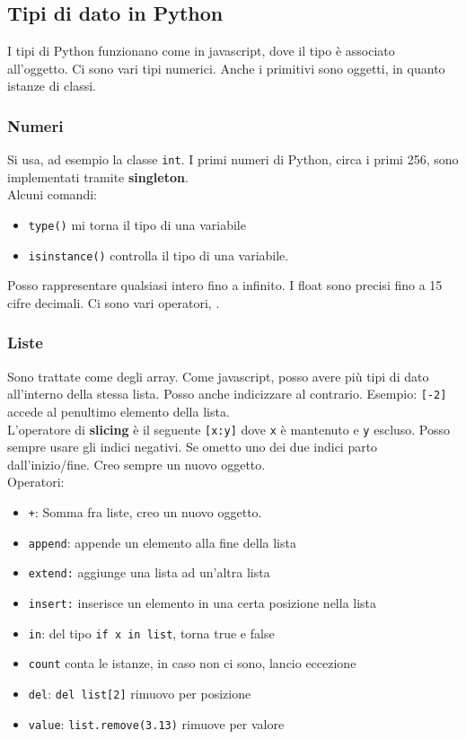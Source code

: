 \documentclass[a4paper,12pt]{article}
\newcommand{\pyRef}[1]{{\color{blue}{DIP pg#1}}}
\begin{document}
\subsection{Tipi di dato in Python}
I tipi di Python funzionano come in javascript, dove il tipo è associato all'oggetto.
Ci sono vari tipi numerici. Anche i primitivi sono oggetti, in quanto istanze di classi. 

\subsubsection{Numeri}
Si usa, ad esempio la classe \texttt{int}. I primi numeri di Python, circa i primi 256, sono implementati tramite \textbf{singleton}.\\
Alcuni comandi:
\begin{itemize}
	\item \texttt{type()} mi torna il tipo di una variabile
	\item \texttt{isinstance()} controlla il tipo di una variabile.
\end{itemize}
Posso rappresentare qualsiasi intero fino a infinito. I float sono precisi fino a 15 cifre decimali. Ci sono vari operatori, \pyRef{57}.

\subsubsection{Liste}
Sono trattate come degli array. Come javascript, posso avere più tipi di dato all'interno della stessa lista. Posso anche indicizzare al contrario. Esempio: \texttt{[-2]} accede al penultimo elemento della lista.\\
L'operatore di \textbf{slicing} è il seguente \texttt{[x:y]} dove \texttt{x} è mantenuto e \texttt{y} escluso. Posso sempre usare gli indici negativi. Se ometto uno dei due indici parto dall'inizio/fine. Creo sempre un nuovo oggetto.\\
Operatori: \pyRef{64}
\begin{itemize}
	\item \texttt{+}: Somma fra liste, creo un nuovo oggetto.
	\item \texttt{append}: appende un elemento alla fine della lista
	\item \texttt{extend:} aggiunge una lista ad un'altra lista
	\item \texttt{insert:} inserisce un elemento in una certa posizione nella lista
	\item \texttt{in}: del tipo \texttt{if x in list}, torna true e false
	\item \texttt{count} conta le istanze, in caso non ci sono, lancio eccezione
	\item \texttt{del}: \texttt{del list[2]} rimuovo per posizione
	\item \texttt{value}: \texttt{list.remove(3.13)} rimuove per valore
\end{itemize}
\end{document}
